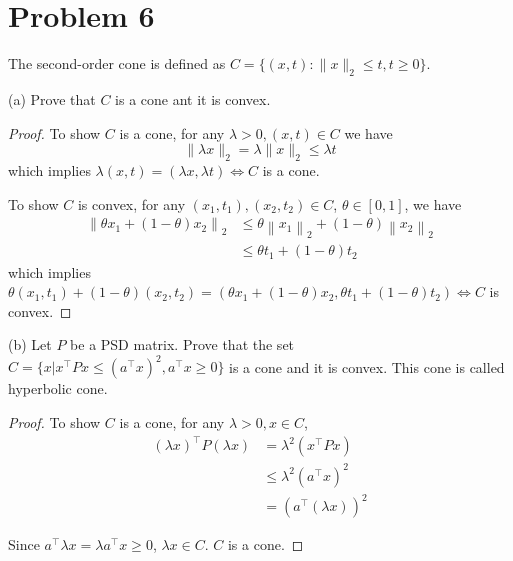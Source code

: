 \documentclass[11pt]{article}
\newcommand{\T}{^\top}
\begin{document}
\clearpage
\section*{Problem 6}
The second-order cone is defined as $C = \{(x, t): \|x\|_2\leq t, t\geq0\}$.

(a) Prove that $C$ is a cone ant it is convex.

\begin{proof}
    To show $C$ is a cone, for any $\lambda>0, (x, t) \in C$ we have
    \[
    \|\lambda x\|_2 = \lambda\|x\|_2 \leq \lambda t
    \]
    which implies $\lambda(x, t) = (\lambda x, \lambda t) \Leftrightarrow C$ is a cone.

    To show $C$ is convex, for any $\left(x_1, t_1\right),\left(x_2, t_2\right) \in C$, $\theta \in[0,1]$, we have
    \begin{align*}
    \left\|\theta x_1+(1-\theta) x_2\right\|_2 & \leq \theta\left\|x_1\right\|_2+(1-\theta)\left\|x_2\right\|_2 \\
    & \leq \theta t_1+(1-\theta) t_2
    \end{align*}
    which implies $\theta\left(x_1, t_1\right)+(1-\theta)\left(x_2, t_2\right)=\left(\theta x_1+(1-\theta) x_2, \theta t_1+(1-\theta) t_2\right)  \Leftrightarrow C$ is convex.
\end{proof}

(b) Let $P$ be a PSD matrix. Prove that the set $C = \{x|x\T Px\leq(a\T x)^2, a\T x\geq0\}$ is a cone and it is convex. This cone is called hyperbolic cone.

\begin{proof}
    To show $C$ is a cone, for any $\lambda>0, x \in C$,
    \begin{align*}
    (\lambda x)^{\top} P(\lambda x) 
    & =\lambda^2 \left(x^{\top} P x\right) \\
    & \leqslant \lambda^2\left(a^{\top} x\right)^2\\
    &=\left(a^{\top}(\lambda x)\right)^2
    \end{align*}
    

    Since $a^{\top} \lambda x  =\lambda a^{\top} x \geq 0$, $\lambda x \in C$. $C$ is a cone.
\end{proof}
\end{document}
